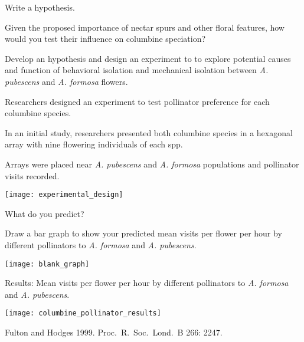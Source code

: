 \documentclass[t,hidelinks]{beamer}
\begin{document}
%
\begin{frame}[t]{Write a hypothesis.}
	
	\hangpara Given the proposed importance of nectar spurs and other floral features, how would you test their influence on columbine speciation?

	\hangpara Develop an hypothesis and design an experiment to  to explore potential causes and function of behavioral isolation and mechanical isolation between \textit{A. pubescens} and \textit{A. formosa} flowers.

\end{frame}
%
\begin{frame}[t]{Researchers designed an experiment to test pollinator preference for each columbine species.}
	
	\begin{multicols}{2}
	\hangpara In an initial study, researchers presented both columbine species in a hexagonal array with nine flowering individuals of each spp. 
	
	\hangpara Arrays were placed near \textit{A. pubescens} and \textit{A. formosa} populations and pollinator visits recorded.
	
	\hangpara {}

	\columnbreak
	
		\texttt{[image: experimental\_design]}
	\end{multicols}

\end{frame}
%
\begin{frame}[t]{What do you predict?}
	
	\vspace*{-\baselineskip}
	
	\hangpara Draw a bar graph to show your predicted mean visits per flower per hour by different pollinators to \textit{A. formosa} and \textit{A. pubescens}.
	
	\bigskip
	
	{\centering
		\texttt{[image: blank\_graph]}\par
	}
	
\end{frame}
%
\begin{frame}[t]{Results: Mean visits per flower per hour by different pollinators to \textit{A. formosa} and \textit{A. pubescens}.}

	{\centering
	\texttt{[image: columbine\_pollinator\_results]}\par
	}

	\vfilll
	
	\tiny Fulton and Hodges 1999. Proc.~R.~Soc.~Lond.~B 266: 2247.
\end{frame}
\end{document}
